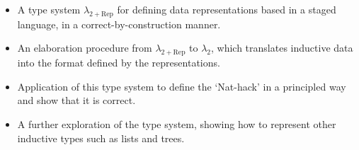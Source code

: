 \begin{itemize}
  \item A type system $\lambda_{2+\text{Rep}}$ for defining data representations based
        in a staged language, in a correct-by-construction manner.
  \item An elaboration procedure from $\lambda_{2+\text{Rep}}$ to $\lambda_2$, which
        translates inductive data into the format defined by the representations.
  \item Application of this type system to define the `Nat-hack' in a principled way
        and show that it is correct.
  \item A further exploration of the type system, showing how to represent other
        inductive types such as lists and trees.
\end{itemize}

